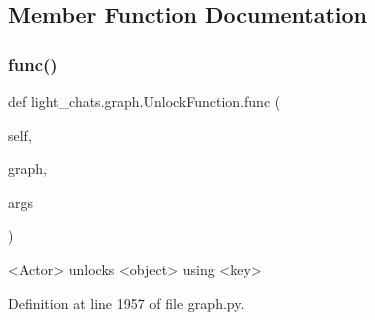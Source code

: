 \subsection{Member Function Documentation}
\mbox{\label{classlight__chats_1_1graph_1_1UnlockFunction_a60b9bd71f3b3d8255c9f79a3a408914f}} 
\subsubsection{\texorpdfstring{func()}{func()}}
{\footnotesize\ttfamily def light\+\_\+chats.\+graph.\+Unlock\+Function.\+func (\begin{DoxyParamCaption}\item[{}]{self,  }\item[{}]{graph,  }\item[{}]{args }\end{DoxyParamCaption})}

\begin{DoxyVerb}<Actor> unlocks <object> using <key>
\end{DoxyVerb}
 

Definition at line 1957 of file graph.\+py.


